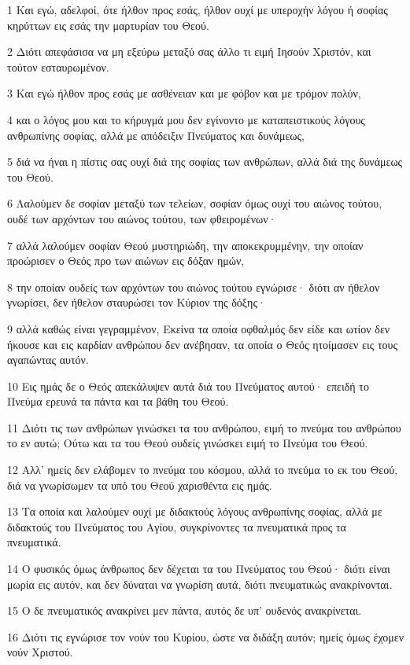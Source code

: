 \par 1 Και εγώ, αδελφοί, ότε ήλθον προς εσάς, ήλθον ουχί με υπεροχήν λόγου ή σοφίας κηρύττων εις εσάς την μαρτυρίαν του Θεού.
\par 2 Διότι απεφάσισα να μη εξεύρω μεταξύ σας άλλο τι ειμή Ιησούν Χριστόν, και τούτον εσταυρωμένον.
\par 3 Και εγώ ήλθον προς εσάς με ασθένειαν και με φόβον και με τρόμον πολύν,
\par 4 και ο λόγος μου και το κήρυγμά μου δεν εγίνοντο με καταπειστικούς λόγους ανθρωπίνης σοφίας, αλλά με απόδειξιν Πνεύματος και δυνάμεως,
\par 5 διά να ήναι η πίστις σας ουχί διά της σοφίας των ανθρώπων, αλλά διά της δυνάμεως του Θεού.
\par 6 Λαλούμεν δε σοφίαν μεταξύ των τελείων, σοφίαν όμως ουχί του αιώνος τούτου, ουδέ των αρχόντων του αιώνος τούτου, των φθειρομένων·
\par 7 αλλά λαλούμεν σοφίαν Θεού μυστηριώδη, την αποκεκρυμμένην, την οποίαν προώρισεν ο Θεός προ των αιώνων εις δόξαν ημών,
\par 8 την οποίαν ουδείς των αρχόντων του αιώνος τούτου εγνώρισε· διότι αν ήθελον γνωρίσει, δεν ήθελον σταυρώσει τον Κύριον της δόξης·
\par 9 αλλά καθώς είναι γεγραμμένον, Εκείνα τα οποία οφθαλμός δεν είδε και ωτίον δεν ήκουσε και εις καρδίαν ανθρώπου δεν ανέβησαν, τα οποία ο Θεός ητοίμασεν εις τους αγαπώντας αυτόν.
\par 10 Εις ημάς δε ο Θεός απεκάλυψεν αυτά διά του Πνεύματος αυτού· επειδή το Πνεύμα ερευνά τα πάντα και τα βάθη του Θεού.
\par 11 Διότι τις των ανθρώπων γινώσκει τα του ανθρώπου, ειμή το πνεύμα του ανθρώπου το εν αυτώ; Ούτω και τα του Θεού ουδείς γινώσκει ειμή το Πνεύμα του Θεού.
\par 12 Αλλ' ημείς δεν ελάβομεν το πνεύμα του κόσμου, αλλά το πνεύμα το εκ του Θεού, διά να γνωρίσωμεν τα υπό του Θεού χαρισθέντα εις ημάς.
\par 13 Τα οποία και λαλούμεν ουχί με διδακτούς λόγους ανθρωπίνης σοφίας, αλλά με διδακτούς του Πνεύματος του Αγίου, συγκρίνοντες τα πνευματικά προς τα πνευματικά.
\par 14 Ο φυσικός όμως άνθρωπος δεν δέχεται τα του Πνεύματος του Θεού· διότι είναι μωρία εις αυτόν, και δεν δύναται να γνωρίση αυτά, διότι πνευματικώς ανακρίνονται.
\par 15 Ο δε πνευματικός ανακρίνει μεν πάντα, αυτός δε υπ' ουδενός ανακρίνεται.
\par 16 Διότι τις εγνώρισε τον νούν του Κυρίου, ώστε να διδάξη αυτόν; ημείς όμως έχομεν νούν Χριστού.

